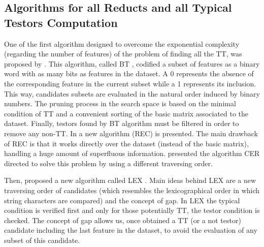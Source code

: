 \documentclass[authoryear,11pt]{elsarticle}
\makeatletter
\newcommand{\setword}[2]{%
  \phantomsection
  #1\def\@currentlabel{\unexpanded{#1}}\label{#2}%
}
\makeatother
\begin{document}
    
\subsection{Algorithms for all Reducts and all Typical Testors Computation}
  One of the first algorithm designed to overcome the exponential complexity (regarding
  the number of features) of the problem of finding all the TT, was 
  proposed by \cite{Ruiz85}. This algorithm, called \setword{BT}{BT},
  codified a subset of features as a binary word with as many bits as features in the 
  dataset. A 0 represents the absence of the corresponding feature in the current
  subset while a 1 represents its inclusion. This way, candidates subsets are evaluated
  in the natural order induced by binary numbers. The pruning process in the
  search space is based on the minimal condition of TT and a convenient sorting
  of the basic matrix associated to the dataset. Finally, 
  testors found by BT algorithm must be filtered in order to remove any non-TT.
  In \citep{Shulcloper95b} a new algorithm (REC) is presented.
  The main drawback of REC is that it works directly over the dataset (instead of the
  basic matrix), handling a huge amount of superfluous information. \cite{Ayaquica97}
  presented the algorithm CER directed to solve this problem by using a different traversing
  order. 
	
  Then, \cite{Santiesteban03} proposed a new algorithm
  called \setword{LEX}{LEX}. Main ideas behind LEX are a new traversing order of candidates (which resembles the
  lexicographical order in which string characters are compared) and the concept of gap. In LEX
  the typical condition is verified first and only for those potentially TT, the testor 
  condition is checked. %
  The concept of gap allows us, once obtained a TT (or a not testor) candidate including 
  the last feature in the dataset, to avoid the evaluation of any subset of this candidate.
	
\end{document}
